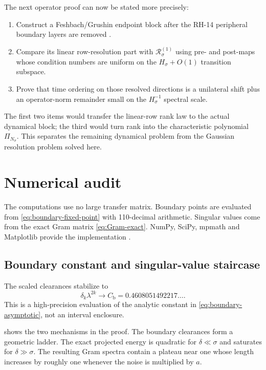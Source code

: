 \documentclass[11pt]{article}
\theoremstyle{definition}
\theoremstyle{remark}
\newcommand{\cR}{\mathcal R}
\begin{document}
The next operator proof can now be stated more precisely:
\begin{enumerate}[label=\textbf{B\arabic*.},leftmargin=3.0em]
 \item Construct a Feshbach/Grushin endpoint block after the RH-14 peripheral
 boundary layers are removed \citep{WangBoundaryLayer2026}.
 \item Compare its linear row-resolution part with
 $\cR_\sigma^{(1)}$ using pre- and
 post-maps whose condition numbers are uniform on the
 $H_\sigma+O(1)$ transition subspace.
 \item Prove that time ordering on those resolved directions is a unilateral
 shift plus an operator-norm remainder small on the $H_\sigma^{-1}$ spectral
 scale.
\end{enumerate}
The first two items would transfer the linear-row rank law to the actual dynamical block;
the third would turn rank into the characteristic polynomial
$\Pi_{N_\sigma}$.  This separates the remaining dynamical problem from the
Gaussian resolution problem solved here.

\section{Numerical audit}
\label{sec:numerics}

The computations use no large transfer matrix.  Boundary points are evaluated
from \eqref{eq:boundary-fixed-point} with 110-decimal arithmetic.  Singular
values come from the exact Gram matrix \eqref{eq:Gram-exact}.  NumPy, SciPy,
mpmath and Matplotlib provide the implementation
\citep{HarrisEtAl2020,VirtanenEtAl2020,Mpmath2026,Hunter2007}.

\subsection{Boundary constant and singular-value staircase}

The scaled clearances stabilize to
\begin{equation}\label{eq:boundary-constant-numerical}
 \delta_k\lambda^{2k}\longrightarrow
 C_{\mathrm b}=0.4608051492217\ldots.
\end{equation}
This is a high-precision evaluation of the analytic constant in
\eqref{eq:boundary-asymptotic}, not an interval enclosure.

 shows the two mechanisms in the proof.  The boundary
clearances form a geometric ladder.  The exact projected energy is quadratic
for $\delta\ll\sigma$ and saturates for $\delta\gg\sigma$.  The resulting
Gram spectra contain a plateau near one whose length increases by roughly one
whenever the noise is multiplied by $a$.
\end{document}
